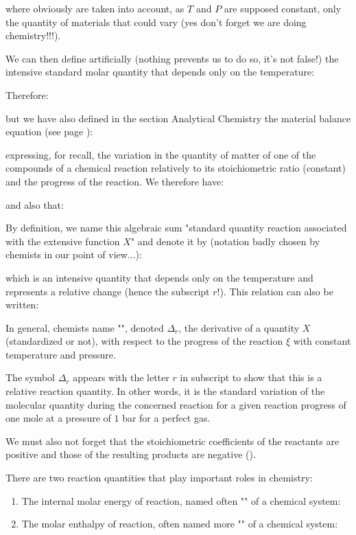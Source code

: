 	where obviously are taken into account, as $T$ and $P$ are supposed constant, only the quantity of materials that could vary (yes don't forget we are doing chemistry!!!).

	We can then define artificially (nothing prevents us to do so, it's not false!) the intensive standard molar quantity that depends only on the temperature:
	
	Therefore:
	
	but we have also defined in the section Analytical Chemistry the material balance equation (see page \pageref{material balance equation}):
	
	expressing, for recall, the variation in the quantity of matter of one of the compounds of a chemical reaction relatively to its stoichiometric ratio (constant) and the progress of the reaction. We therefore have:
	
	and also that:
	
	By definition, we name this algebraic sum "standard quantity reaction associated with the extensive function $X$" and denote it by (notation badly chosen by chemists in our point of view...):
	
	which is an intensive quantity that depends only on the temperature and represents a relative change (hence the subscript $r$!). This relation can also be written:
	
	In general, chemists name "", denoted $\Delta_r$, the derivative of a quantity $X$ (standardized or not), with respect to the progress of the reaction $\xi$ with constant temperature and pressure.
	\begin{tcolorbox}[title=Remark,arc=10pt,breakable,drop lifted shadow,
  skin=enhanced,
  skin first is subskin of={enhancedfirst}{arc=10pt,no shadow},
  skin middle is subskin of={enhancedmiddle}{arc=10pt,no shadow},
  skin last is subskin of={enhancedlast}{drop lifted shadow}]
	The symbol $\Delta_r$ appears with the letter $r$ in subscript to show that this is a relative reaction quantity. In other words, it is the standard variation of the molecular quantity during the concerned reaction for a given reaction progress of one mole at a pressure of $1$ bar for a perfect gas.
	\end{tcolorbox}
	We must also not forget that the stoichiometric coefficients of the reactants are positive and those of the resulting products are negative ().

	There are two reaction quantities that play important roles in chemistry:
	\begin{enumerate}
		\item The internal molar energy of reaction, named often "" of a chemical system:
		

		\item The molar enthalpy of reaction, often named more "" of a chemical system:
		
	\end{enumerate}
	
